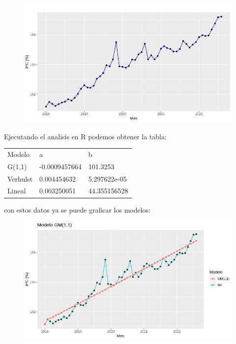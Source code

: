 \documentclass[a4paper,10pt]{article}
\begin{document}
\begin{figure}[htb!]
 \centering
 \includegraphics[width=\textwidth]{../images/histograma.png}
\end{figure}

Ejecutando el analisis en R podemos obtener la tabla:

\begin{center}
\begin{tabular}{lll}
Modelo & a & b\\
G(1,1) & -0.0009457664 & 101.3253 \\
Verhulst & 0.004454632 & 5.297622e-05 \\
Lineal & 0.003250051 & 44.355156528 \\
\end{tabular}
\end{center}

con estos datos ya se puede graficar los modelos:


\begin{figure}[htb!]
 \centering
 \includegraphics[width=\textwidth]{../images/gm.png}
\end{figure}
\end{document}
